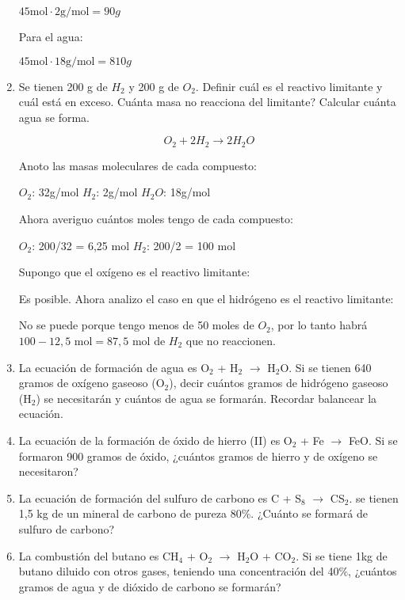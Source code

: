 \begin{enumerate}
$45 \text{mol} \cdot 2\text{g/mol} = 90 g$

\skipline
Para el agua:

$45 \text{mol} \cdot 18\text{g/mol} = 810g$


\item 
Se tienen 200 g de $H_2$ y 200 g de $O_2$.
Definir cuál es el reactivo limitante y cuál está en exceso.
Cuánta masa no reacciona del limitante?
Calcular cuánta agua se forma.

$$O_2 + 2H_2 \longrightarrow 2H_2O$$

Anoto las masas moleculares de cada compuesto:

\hfil$O_2$: 32g/mol\hfil
$H_2$: 2g/mol\hfil
$H_2O$: 18g/mol\hfil

\skipline
Ahora averiguo cuántos moles tengo de cada compuesto:

\hfil$O_2$: 200/32 = 6,25 mol\hfil
$H_2$: 200/2 = 100 mol\hfil

\skipline
Supongo que el oxígeno es el reactivo limitante:

Es posible. Ahora analizo el caso en que el hidrógeno es el reactivo limitante:

No se puede porque tengo menos de 50 moles de $O_2$, por lo tanto habrá $100-12,5 \text{ mol} = 87,5 \text{ mol}$ de $H_2$ que no reaccionen.


\item La ecuación de formación de agua es O$_2$ + H$_2$ $\longrightarrow$ H$_2$O. Si se tienen 640 gramos de oxígeno gaseoso (O$_2$), decir cuántos gramos de hidrógeno gaseoso (H$_2$) se necesitarán y cuántos de agua se formarán. Recordar balancear la ecuación.

\item La ecuación de la formación de óxido de hierro (II) es O$_2$ + Fe $\longrightarrow$ FeO. Si se formaron 900 gramos de óxido, ¿cuántos gramos de hierro y de oxígeno se necesitaron?

\item La ecuación de formación del sulfuro de carbono es C + S$_8$ $\longrightarrow$ CS$_2$. se tienen 1,5 kg de un mineral de carbono de pureza 80\%. ¿Cuánto se formará de sulfuro de carbono?

\item La combustión del butano es CH$_4$ + O$_2$ $\longrightarrow$ H$_2$O + CO$_2$. Si se tiene 1kg de butano diluido con otros gases, teniendo una concentración del 40$\%$, ¿cuántos gramos de agua y de dióxido de carbono se formarán?


\end{enumerate}
